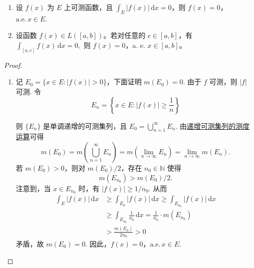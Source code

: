 \documentclass[../../main.tex]{subfiles}
\begin{document}
\begin{theorem}[可积函数几乎处处为零的判别法]\label{theorem:可积函数几乎处处为零的一种判别法}
\begin{enumerate}[(1)]
\item 设 \( f(x) \) 为 \( E \) 上可测函数，且 \( \int_E |f(x)|\,\mathrm{d}x = 0 \)，则 \( f(x) = 0 \)，\(\text{a.e.}\, x \in E \).

\item 设函数 $f(x) \in L([a,b])$。若对任意的 $c \in [a,b]$，有$\int_{[a,c]} f(x) \, \mathrm{d}x = 0,$
则 $f(x) = 0$，a. e. $x \in [a,b]$。
\end{enumerate}
\end{theorem}
\begin{proof}
\begin{enumerate}[(1)]
\item 记 \( E_0 = \{ x \in E : |f(x)| > 0 \} \)，下面证明 \( m(E_0) = 0 \). 由于 \( f \) 可测，则 \( |f| \) 可测. 令
\[
E_n = \left\{ x \in E : |f(x)| \geqslant \frac{1}{n} \right\}
\]

则 \( \{ E_n \} \) 是单调递增的可测集列，且 \( E_0 = \bigcup_{n = 1}^{\infty} E_n \). 由\hyperref[theorem:递增可测集列的测度运算]{递增可测集列的测度运算}可得
\[
m(E_0) = m\left( \bigcup_{n = 1}^{\infty} E_n \right) = m\left( \lim_{n \to \infty} E_n \right) = \lim_{n \to \infty} m(E_n).
\]
若 \( m(E_0) > 0 \)，则对 \( m(E_0)/2 \)，存在 \( n_0 \in \mathbb{N} \) 使得
\[
m(E_{n_0}) > m(E_0)/2.
\]
注意到，当 \( x \in E_{n_0} \) 时，有 \( |f(x)| \geqslant 1/n_0 \). 从而
\begin{align*}
\int_E |f(x)|\,\mathrm{d}x &\geqslant \int_{E_0} |f(x)|\,\mathrm{d}x \geqslant \int_{E_{n_0}} |f(x)|\,\mathrm{d}x \\
&\geqslant \int_{E_{n_0}} \frac{1}{n_0}\,\mathrm{d}x = \frac{1}{n_0} \cdot m(E_{n_0}) \\
&> \frac{m(E_0)}{2n_0} > 0
\end{align*}
矛盾，故 \( m(E_0) = 0 \). 因此，\( f(x) = 0 \)，\(\text{a.e.}\, x \in E \).


\end{enumerate}
\end{proof}
\end{document}
